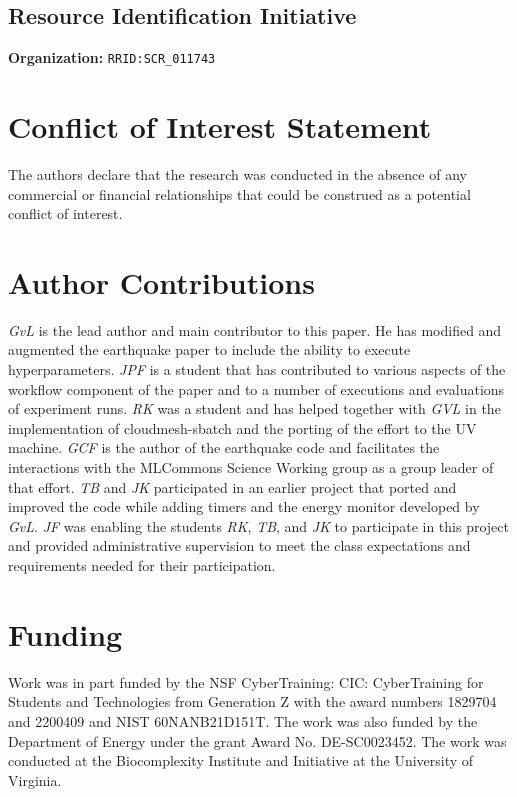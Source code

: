 \documentclass[utf8]{FrontiersinVancouver} %
\begin{document}
\subsection{Resource Identification Initiative}

{\bf Organization:} \verb|RRID:SCR_011743|

\section*{Conflict of Interest Statement}

The authors declare that the research was conducted in the absence of
any commercial or financial relationships that could be construed as a
potential conflict of interest.

\section*{Author Contributions}

{\em GvL} is the lead author and main contributor to this paper. He
has modified and augmented the earthquake paper to include the ability
to execute hyperparameters. {\em JPF} is a student that has
contributed to various aspects of the workflow component of the paper
and to a number of executions and evaluations of experiment runs. {\em
  RK} was a student and has helped together with {\em GVL} in the
implementation of cloudmesh-sbatch and the porting of the effort to
the UV machine.  {\em GCF} is the author of the earthquake code and
facilitates the interactions with the MLCommons Science Working group
as a group leader of that effort. {\em TB} and {\em JK} participated
in an earlier project that ported and improved the code while adding
timers and the energy monitor developed by {\em GvL}. {\em JF} was
enabling the students {\em RK}, {\em TB}, and {\em JK} to participate
in this project and provided administrative supervision to meet the
class expectations and requirements needed for their participation.

\section*{Funding}

Work was in part funded by the NSF CyberTraining: CIC: CyberTraining
for Students and Technologies from Generation Z with the award numbers
1829704 and 2200409 and NIST 60NANB21D151T.  The work was also funded
by the Department of Energy under the grant Award
No. DE-SC0023452. The work was conducted at the Biocomplexity
Institute and Initiative at the University of Virginia.
\end{document}
